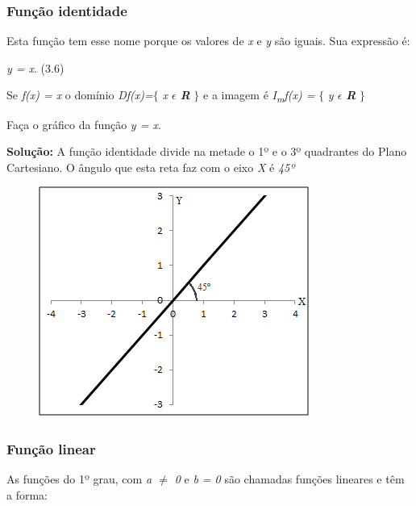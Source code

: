 \subsubsection{Função identidade}

Esta função tem esse nome porque os valores de \textit{x} e \textit{y} são iguais. Sua expressão é:

\begin{caixa}
\textit{y = x}. \tab (3.6)
\end{caixa}

Se \textit{f(x) = x}  o domínio \textit{Df(x)=}$ \{ $ \textit{ x $ \epsilon $  \textbf{R}} $ \} $  e a imagem é \textit{I\textsubscript{m}f(x) =} $ \{ $ \textit{ y $ \epsilon $  \textbf{R}} $ \} $ \qedsymbol{}

\begin{texemplo}
Faça o gráfico da função  \textit{y = x}.

\textbf{Solução:} A função identidade divide na metade o 1º e o 3º quadrantes do Plano Cartesiano. O ângulo que esta reta faz com o eixo \textit{X} é \textit{45º }\qedsymbol{}

\begin{figure}[H]
	\begin{Center}
		\includegraphics[width=3.52in,height=2.98in]{capitulos/funcao_do_primeiro_grau/media/image20.png}
	\end{Center}
\end{figure}
\end{texemplo}

\subsubsection{Função linear}

As funções do 1º grau, com \textit{a $ \neq $   0}  e \textit{b = 0} são chamadas funções lineares e têm a forma:

